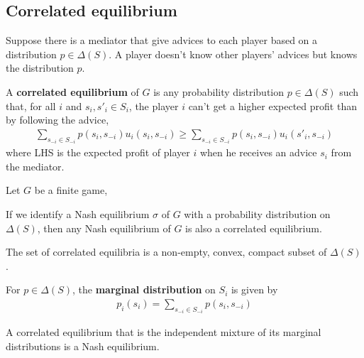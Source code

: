 \documentclass[11pt]{elegantbook_2}
\begin{document}
\subsection{Correlated equilibrium}
Suppose there is a mediator that give advices to each player based on a distribution $p \in \Delta(S)$. A player doesn't know other players' advices but knows the distribution $p$.
\begin{definition}
    A \textbf{correlated equilibrium} of $G$ is any probability distribution $p \in \Delta(S)$ such that, for all $i$ and $s_i,s'_i \in S_i$, the player $i$ can't get a higher expected profit than by following the advice,
    \begin{equation}
        \begin{aligned}
            \sum_{s_{-i}\in S_{-i}}p(s_i,s_{-i})u_i(s_i,s_{-i})\geq\sum_{s_{-i}\in S_{-i}}p(s_i,s_{-i})u_i(s'_i,s_{-i})
        \end{aligned}
        \nonumber
    \end{equation}
    where LHS is the expected profit of player $i$ when he receives an advice $s_i$ from the mediator.
\end{definition}

Let $G$ be a finite game,
\begin{proposition}
    If we identify a Nash equilibrium $\sigma$ of $G$ with a probability distribution on $\Delta(S)$, then any Nash equilibrium of $G$ is also a correlated equilibrium.
\end{proposition}

\begin{proposition}
    The set of correlated equilibria is a non-empty, convex, compact subset of $\Delta(S)$.
\end{proposition}

For $p\in\Delta(S)$, the \textbf{marginal distribution} on $S_i$ is given by
\begin{equation}
    \begin{aligned}
        p_i(s_i)=\sum_{s_{-i}\in S_{-i}}p(s_i,s_{-i})
    \end{aligned}
    \nonumber
\end{equation}
\begin{proposition}
    A correlated equilibrium that is the independent mixture of its marginal distributions is a Nash equilibrium.
\end{proposition}
\end{document}
